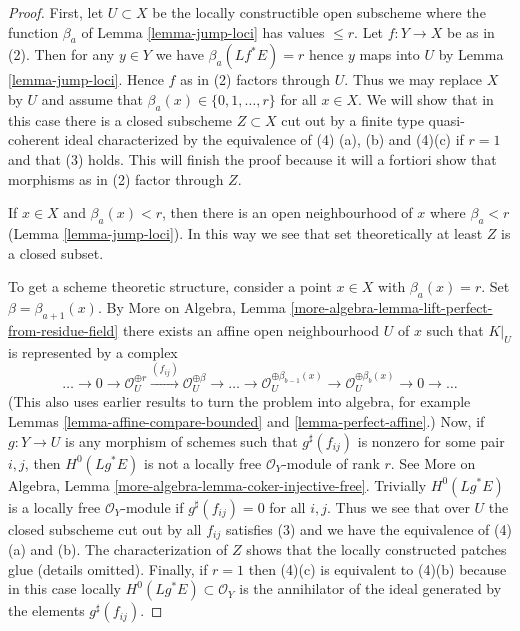 \begin{proof}
First, let $U \subset X$ be the locally constructible
open subscheme where the function
$\beta_a$ of Lemma \ref{lemma-jump-loci} has values $\leq r$.
Let $f : Y \to X$ be as in (2). Then for any $y \in Y$
we have $\beta_a(Lf^*E) = r$ hence $y$ maps into $U$ by
Lemma \ref{lemma-jump-loci}. Hence $f$ as in (2) factors through $U$.
Thus we may replace $X$ by $U$ and assume that
$\beta_a(x) \in \{0, 1, \ldots, r\}$ for all $x \in X$.
We will show that in this case
there is a closed subscheme $Z \subset X$ cut out by a finite type
quasi-coherent ideal characterized
by the equivalence of (4) (a), (b) and (4)(c) if $r = 1$
and that (3) holds.
This will finish the proof because it will a fortiori show
that morphisms as in (2) factor through $Z$.

\medskip\noindent
If $x \in X$ and $\beta_a(x) < r$, then there is an
open neighbourhood of $x$ where $\beta_a < r$
(Lemma \ref{lemma-jump-loci}). In this way we
see that set theoretically at least $Z$ is a closed subset.

\medskip\noindent
To get a scheme theoretic structure, consider a point $x \in X$
with $\beta_a(x) = r$. Set $\beta = \beta_{a + 1}(x)$.
By More on Algebra, Lemma
\ref{more-algebra-lemma-lift-perfect-from-residue-field}
there exists an affine open neighbourhood $U$ of $x$
such that $K|_U$ is represented by a complex
$$
\ldots \to 0 \to \mathcal{O}_U^{\oplus r}
\xrightarrow{(f_{ij})} \mathcal{O}_U^{\oplus \beta} \to
\ldots \to
\mathcal{O}_U^{\oplus \beta_{b - 1}(x)} \to
\mathcal{O}_U^{\oplus \beta_b(x)} \to 0
\to \ldots
$$
(This also uses earlier results to turn the problem into algebra, for example
Lemmas \ref{lemma-affine-compare-bounded} and
\ref{lemma-perfect-affine}.) Now, if $g : Y \to U$ is any morphism
of schemes such that $g^\sharp(f_{ij})$ is nonzero for some pair $i, j$, then
$H^0(Lg^*E)$ is not a locally free $\mathcal{O}_Y$-module of rank $r$.
See More on Algebra, Lemma \ref{more-algebra-lemma-coker-injective-free}.
Trivially $H^0(Lg^*E)$ is a locally free $\mathcal{O}_Y$-module if
$g^\sharp(f_{ij}) = 0$ for all $i, j$. Thus we see that over $U$ the
closed subscheme cut out by all $f_{ij}$ satisfies
(3) and we have the equivalence of (4)(a) and (b).
The characterization of $Z$ shows that the locally constructed patches
glue (details omitted). Finally, if $r = 1$ then
(4)(c) is equivalent to (4)(b) because in this case locally
$H^0(Lg^*E) \subset \mathcal{O}_Y$ is the annihilator of the ideal generated
by the elements $g^\sharp(f_{ij})$.
\end{proof}





